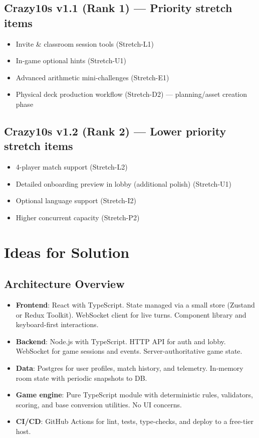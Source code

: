 \documentclass[12pt]{article}
\begin{document}
\subsection{Crazy10s v1.1 (Rank 1) --- Priority stretch items}
\begin{itemize}
  \item Invite \& classroom session tools (Stretch-L1)
  \item In-game optional hints (Stretch-U1)
  \item Advanced arithmetic mini-challenges (Stretch-E1)
  \item Physical deck production workflow (Stretch-D2) --- planning/asset creation phase
\end{itemize}

\subsection{Crazy10s v1.2 (Rank 2) --- Lower priority stretch items}
\begin{itemize}
  \item 4-player match support (Stretch-L2)
  \item Detailed onboarding preview in lobby (additional polish) (Stretch-U1)
  \item Optional language support (Stretch-I2)
  \item Higher concurrent capacity (Stretch-P2)
\end{itemize}

\section{Ideas for Solution}
\subsection{Architecture Overview}
\begin{itemize}
  \item \textbf{Frontend}: React with TypeScript. State managed via a small store (Zustand or Redux Toolkit). WebSocket client for live turns. Component library and keyboard-first interactions.
  \item \textbf{Backend}: Node.js with TypeScript. HTTP API for auth and lobby. WebSocket for game sessions and events. Server-authoritative game state.
  \item \textbf{Data}: Postgres for user profiles, match history, and telemetry. In-memory room state with periodic snapshots to DB.
  \item \textbf{Game engine}: Pure TypeScript module with deterministic rules, validators, scoring, and base conversion utilities. No UI concerns.
  \item \textbf{CI/CD}: GitHub Actions for lint, tests, type-checks, and deploy to a free-tier host.
\end{itemize}
\end{document}
